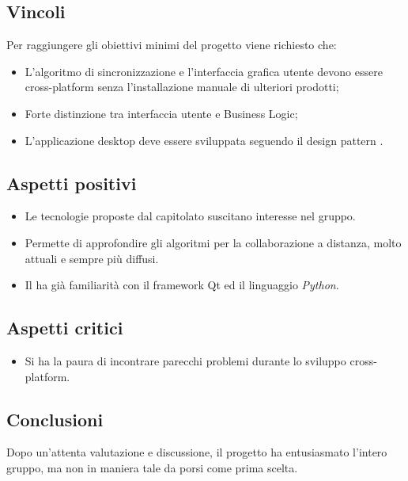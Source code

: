 \subsection{Vincoli}
Per raggiungere gli obiettivi minimi del progetto viene richiesto che:
\begin{itemize}
	\item L'algoritmo di sincronizzazione e l'interfaccia grafica utente devono essere cross-platform senza l'installazione manuale di ulteriori prodotti;
	\item Forte distinzione tra interfaccia utente e Business Logic;
	\item L'applicazione desktop deve essere sviluppata seguendo il design pattern .
\end{itemize}

\subsection{Aspetti positivi}
\begin{itemize}
	\item Le tecnologie proposte dal capitolato suscitano interesse nel gruppo.
	\item Permette di approfondire gli algoritmi per la collaborazione a distanza, molto attuali e sempre più diffusi.
	\item Il  ha già familiarità con il framework Qt ed il linguaggio \textit{Python}.
\end{itemize}

\subsection{Aspetti critici}
\begin{itemize}
	\item Si ha la paura di incontrare parecchi problemi durante lo sviluppo cross-platform.
\end{itemize}

\subsection{Conclusioni}
Dopo un'attenta valutazione e discussione, il progetto ha entusiasmato l'intero gruppo, ma non in maniera tale da porsi come prima scelta.
